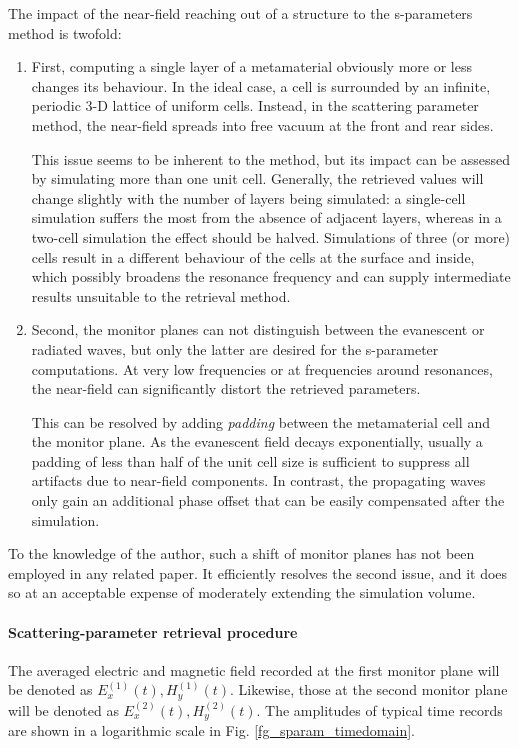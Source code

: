 The impact of the near-field reaching out of a structure to the s-parameters method is twofold:
\begin{enumerate}
 \item{First, computing a single layer of a metamaterial obviously more or less changes its behaviour. In the ideal case, a cell is surrounded by an infinite, periodic 3-D lattice of uniform cells.  Instead, in the scattering parameter method, %
the near-field spreads into free vacuum at the front and rear sides. 

This issue seems to be inherent to the method, but its impact can be assessed by simulating more than one unit cell. Generally, the retrieved values will change slightly with the number of layers being simulated: a single-cell simulation suffers the most from the absence of adjacent layers, whereas in a two-cell simulation the effect should be halved. Simulations of three (or more) cells result in a different behaviour of the cells at the surface and inside, which possibly broadens the resonance frequency and can supply intermediate results unsuitable to the retrieval method.
 } 
 \item{Second, the monitor planes can not distinguish between the evanescent or radiated waves, but only the latter are desired for the s-parameter computations. At very low frequencies or at frequencies around resonances, the near-field can significantly distort the retrieved parameters.

This can be resolved by adding \textit{padding} between the metamaterial cell and the monitor plane. As the evanescent field decays exponentially, usually a padding of less than half of the unit cell size is sufficient to suppress all artifacts due to near-field components. In contrast, the propagating waves only gain an additional phase offset that can be easily compensated after the simulation. } 
 \end{enumerate}
To the knowledge of the author, such a shift of monitor planes has not been employed in any related paper. It efficiently resolves the second issue, and it does so at an acceptable expense of moderately extending the simulation volume.
\paragraph{Scattering-parameter retrieval procedure} %
The averaged electric and magnetic field recorded at the first monitor plane will be denoted as $E_{x}^{(1)}(t), H_{y}^{(1)}(t)$. Likewise, those at the second monitor plane will be denoted as $E_{x}^{(2)}(t), H_{y}^{(2)}(t)$. The amplitudes of typical time records are shown in a logarithmic scale in Fig. \ref{fg_sparam_timedomain}. 

